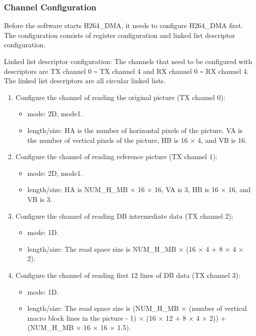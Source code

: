 \documentclass[main\_\_EN.tex]{subfiles}
\begin{document}
\subsubsection{Channel Configuration}\label{sec:h264-dma-ch-cfg}
Before the software starts H264\_DMA, it needs to configure H264\_DMA first. The configuration consists of register configuration and linked list descriptor configuration.

Linked list descriptor configuration: The channels that need to be configured with descriptors are TX channel 0 \verb+~+ TX channel 4 and RX channel 0 \verb+~+ RX channel 4. The linked list descriptors are all circular linked lists.
\begin{enumerate}
    \item Configure the channel of reading the original picture (TX channel 0):
    \begin{itemize}
        \item mode: 2D, mode1.
        \item length/size: HA is the number of horizontal pixels of the picture. VA is the number of vertical pixels of the picture, HB is 16 × 4, and VB is 16.
    \end{itemize}
    \item Configure the channel of reading reference picture (TX channel 1):
    \begin{itemize}
        \item mode: 2D, mode1.
        \item length/size: HA is NUM\_H\_MB × 16 × 16, VA is 3, HB is 16 × 16, and VB is 3.
    \end{itemize}
    \item Configure the channel of reading DB intermediate data (TX channel 2):
    \begin{itemize}
        \item mode: 1D.
        \item length/size: The read space size is NUM\_H\_MB × (16 × 4 + 8 × 4 × 2).
    \end{itemize}
    \item Configure the channel of reading first 12 lines of DB data (TX channel 3):
    \begin{itemize}
        \item mode: 1D.
        \item length/size: The read space size is (NUM\_H\_MB × (number of vertical macro block lines in the picture - 1) × (16 × 12 + 8 × 4 × 2)) + (NUM\_H\_MB × 16 × 16 × 1.5).
    \end{itemize}

\end{enumerate}
\end{document}
